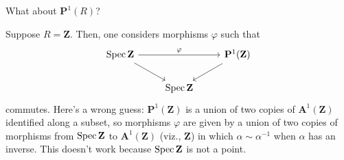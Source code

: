 \documentclass [11 pt, oneside, margin = 1 in] {article}
\begin{document}
\begin{problem}
	What about $\mathbf{P}^1(R)$?
\end{problem}

\begin{example}[ ]\label{}\text{}
Suppose $R=\mathbf{Z}$. Then, one considers morphisms $\varphi$ such that
\[
\begin{tikzcd}
	\Spec \mathbf{Z} \ar[rd]\ar[rr,"\varphi"] &&\mathbf{P}^1(\mathbf{Z})\ar[ld]\\
						  &\Spec \mathbf{Z}
\end{tikzcd}
\]
commutes.
Here's a wrong guess: $\mathbf{P}^1(\mathbf{Z})$ is a union of two copies of $\mathbf{A}^1(\mathbf{Z})$ identified along a subset, so morphisms $\varphi$ are given by a union of two copies of morphisms from $\operatorname{Spec} \mathbf{Z}$ to $\mathbf{A}^1(\mathbf{Z})$ (viz., $\mathbf{Z}$) in which $\alpha\sim \alpha^{-1}$ when $\alpha$ has an inverse. This doesn't work because $\operatorname{Spec} \mathbf{Z}$ is not a point.


\end{example}
\end{document}
